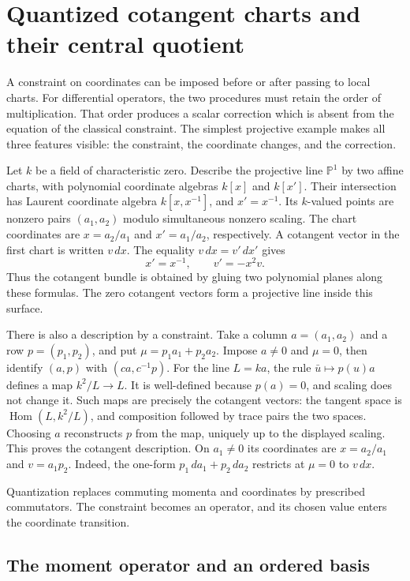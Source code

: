 \chapter{Quantized cotangent charts and their central quotient}
\label{chap:qc-quantum-collision}

A constraint on coordinates can be imposed before or after passing to local charts.
For differential operators, the two procedures must retain the order of multiplication.
That order produces a scalar correction which is absent from the equation of the classical constraint.
The simplest projective example makes all three features visible: the constraint, the coordinate changes, and the correction.

Let $k$ be a field of characteristic zero.
Describe the projective line $\mathbb P^1$ by two affine charts, with polynomial coordinate algebras $k[x]$ and $k[x']$.
Their intersection has Laurent coordinate algebra $k[x,x^{-1}]$, and $x'=x^{-1}$.
Its $k$-valued points are nonzero pairs $(a_1,a_2)$ modulo simultaneous nonzero scaling.
The chart coordinates are $x=a_2/a_1$ and $x'=a_1/a_2$, respectively.
A cotangent vector in the first chart is written $v\,dx$.
The equality $v\,dx=v'\,dx'$ gives
\[
 x'=x^{-1},\qquad v'=-x^2v.
\]
Thus the cotangent bundle is obtained by gluing two polynomial planes along these formulas.
The zero cotangent vectors form a projective line inside this surface.

There is also a description by a constraint.
Take a column $a=(a_1,a_2)$ and a row $p=(p_1,p_2)$, and put $\mu=p_1a_1+p_2a_2$.
Impose $a\ne0$ and $\mu=0$, then identify $(a,p)$ with $(c a,c^{-1}p)$.
For the line $L=ka$, the rule $\bar u\mapsto p(u)a$ defines a map $k^2/L\to L$.
It is well-defined because $p(a)=0$, and scaling does not change it.
Such maps are precisely the cotangent vectors: the tangent space is $\operatorname{Hom}(L,k^2/L)$, and composition followed by trace pairs the two spaces.
Choosing $a$ reconstructs $p$ from the map, uniquely up to the displayed scaling.
This proves the cotangent description.
On $a_1\ne0$ its coordinates are $x=a_2/a_1$ and $v=a_1p_2$.
Indeed, the one-form $p_1\,da_1+p_2\,da_2$ restricts at $\mu=0$ to $v\,dx$.

Quantization replaces commuting momenta and coordinates by prescribed commutators.
The constraint becomes an operator, and its chosen value enters the coordinate transition.

\section{The moment operator and an ordered basis}

